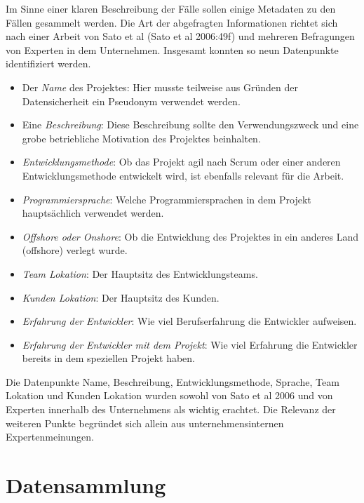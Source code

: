 Im Sinne einer klaren Beschreibung der Fälle sollen einige Metadaten zu
den Fällen gesammelt werden. Die Art der abgefragten Informationen
richtet sich nach einer Arbeit von Sato et al (Sato et al 2006:49f) und
mehreren Befragungen von Experten in dem Unternehmen. Insgesamt konnten
so neun Datenpunkte identifiziert werden.

\begin{itemize}
    \item
      Der \emph{Name} des Projektes: Hier musste teilweise aus Gründen der
      Datensicherheit ein Pseudonym verwendet werden.
    \item
      Eine \emph{Beschreibung}: Diese Beschreibung sollte den
      Verwendungszweck und eine grobe betriebliche Motivation des Projektes
      beinhalten.
    \item
      \emph{Entwicklungsmethode}: Ob das Projekt agil nach Scrum oder einer
      anderen Entwicklungsmethode entwickelt wird, ist ebenfalls relevant
      für die Arbeit.
    \item
      \emph{Programmiersprache}: Welche Programmiersprachen in dem Projekt
      hauptsächlich verwendet werden.
    \item
      \emph{Offshore oder Onshore}: Ob die Entwicklung des Projektes in ein
      anderes Land (offshore) verlegt wurde.
    \item
      \emph{Team Lokation}: Der Hauptsitz des Entwicklungsteams.
    \item
      \emph{Kunden Lokation}: Der Hauptsitz des Kunden.
    \item
      \emph{Erfahrung der Entwickler}: Wie viel Berufserfahrung die
      Entwickler aufweisen.
    \item
      \emph{Erfahrung der Entwickler mit dem Projekt}: Wie viel Erfahrung
      die Entwickler bereits in dem speziellen Projekt haben.
    \end{itemize}

Die Datenpunkte Name, Beschreibung, Entwicklungsmethode, Sprache, Team
Lokation und Kunden Lokation wurden sowohl von Sato et al 2006 und von
Experten innerhalb des Unternehmens als wichtig erachtet. Die Relevanz
der weiteren Punkte begründet sich allein aus unternehmensinternen
Expertenmeinungen.

\section{Datensammlung}\label{datensammlung}

